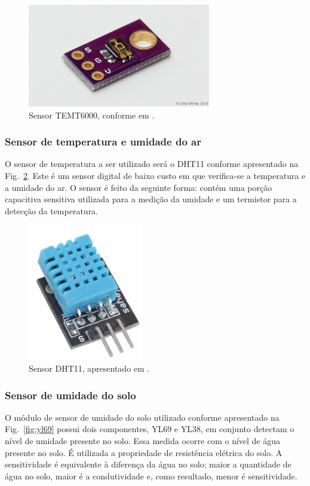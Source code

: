 \documentclass[conference]{IEEEtran}
\begin{document}
\begin{figure}
    \centering
    \includegraphics[width=8cm]{temt6000.jpg}
    \caption{Sensor TEMT6000, conforme em \cite{b25}.}
    \label{fig:temt6000}
\end{figure}

\subsubsection{Sensor de temperatura e umidade do ar}
O sensor de temperatura a ser utilizado será o DHT11 conforme apresentado na Fig.~\ref{fig:dht11}. Este é um sensor digital de baixo custo em que verifica-se a temperatura e a umidade do ar. O sensor é feito da seguinte forma: contém uma porção capacitiva sensitiva utilizada para a medição da umidade e um termistor para a detecção da temperatura. \cite{b9, b10}

\begin{figure}
    \centering
    \includegraphics[width=5cm]{dht11.png}
    \caption{Sensor DHT11, apresentado em \cite{b26}.}
    \label{fig:dht11}
\end{figure}

\subsubsection{Sensor de umidade do solo}
O módulo de sensor de umidade do solo utilizado conforme apresentado na Fig.~\ref{fig:yl69} possui dois componentes, YL69 e YL38, em conjunto detectam o nível de umidade presente no solo. Essa medida ocorre com o nível de água presente no solo. É utilizada a propriedade de resistência elétrica do solo. A sensitividade é equivalente à diferença da água no solo; maior a quantidade de água no solo, maior é a condutividade e, como resultado, menor é sensitividade. \cite{b9, b10}
\end{document}
